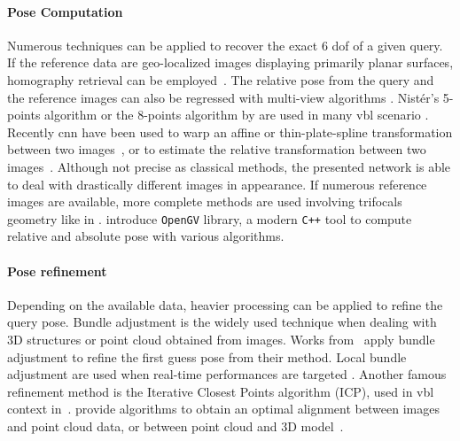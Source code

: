 		\paragraph{Pose Computation}
        	\label{para:pose_compute}
			Numerous techniques can be applied to recover the exact 6 \ac{dof} of a given query. If the reference data are geo-localized images displaying primarily planar surfaces, homography retrieval can be employed~\citep{Forstner2016}. The relative pose from the query and the reference images can also be regressed with multi-view algorithms \citep{Hartley2003}. Nist\'er's 5-points algorithm \citep{Nister2004} or the 8-points algorithm by \citet{Hartley1997} are used in many \ac{vbl} scenario \citep{Qu2016}. Recently \ac{cnn} have been used to warp an affine or thin-plate-spline transformation between two images~\citep{Rocco2017}, or to estimate the relative transformation between two images~\citep{Melekhova}. Although not precise as classical methods, the presented network is able to deal with drastically different images in appearance. If numerous reference images are available, more complete methods are used involving trifocals geometry \citep{Hartley2003} like in \citep{Song2016}. \citet{Kneip2014opengv} introduce \texttt{OpenGV} library, a modern \texttt{C++} tool to compute relative and absolute pose with various algorithms.

		\paragraph{Pose refinement}
			Depending on the available data, heavier processing can be applied to refine the query pose. Bundle adjustment is the widely used technique when dealing with 3D structures or point cloud obtained from images. Works from~\citep{Middelberg2014,Wan2014,Forstner2016} apply bundle adjustment to refine the first guess pose from their method. Local bundle adjustment are used when real-time performances are targeted \citep{Li2010,Qu2016}. Another famous refinement method is the Iterative Closest Points algorithm (ICP), used in \ac{vbl} context in~\citep{Russell2011,Baatz2012,Morago2016}. \citet{Pani2015Lmi} provide algorithms to obtain an optimal alignment between images and point cloud data, or between point cloud and 3D model~\citep{Pani2015Robust}.
			

